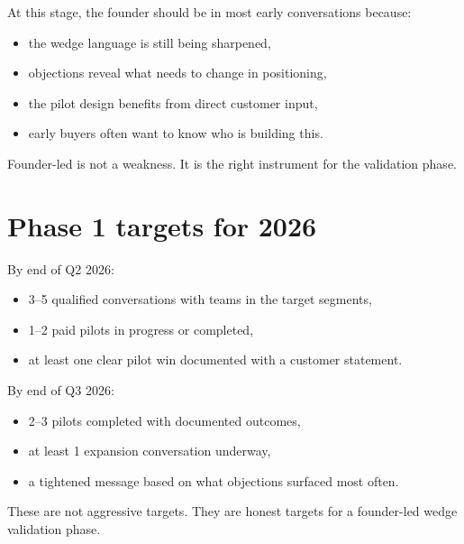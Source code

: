At this stage, the founder should be in most early conversations because:

\begin{itemize}
  \item the wedge language is still being sharpened,
  \item objections reveal what needs to change in positioning,
  \item the pilot design benefits from direct customer input,
  \item early buyers often want to know who is building this.
\end{itemize}

Founder-led is not a weakness.
It is the right instrument for the validation phase.

\section{Phase 1 targets for 2026}

By end of Q2 2026:

\begin{itemize}
  \item 3--5 qualified conversations with teams in the target segments,
  \item 1--2 paid pilots in progress or completed,
  \item at least one clear pilot win documented with a customer statement.
\end{itemize}

By end of Q3 2026:

\begin{itemize}
  \item 2--3 pilots completed with documented outcomes,
  \item at least 1 expansion conversation underway,
  \item a tightened message based on what objections surfaced most often.
\end{itemize}

These are not aggressive targets.
They are honest targets for a founder-led wedge validation phase.
